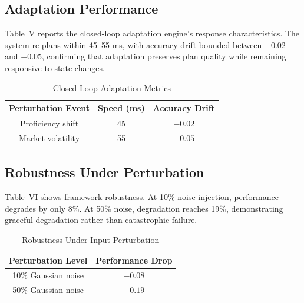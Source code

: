\documentclass[conference]{IEEEtran}
\begin{document}
\subsection{Adaptation Performance}

Table~V reports the closed-loop adaptation engine's response characteristics. The system re-plans within 45--55 ms, with accuracy drift bounded between $-0.02$ and $-0.05$, confirming that adaptation preserves plan quality while remaining responsive to state changes.

\begin{table}[htbp]
    \caption{Closed-Loop Adaptation Metrics}
    \begin{center}
        \begin{tabular}{|c|c|c|}
            \hline
            \textbf{Perturbation Event} & \textbf{Speed (ms)} & \textbf{Accuracy Drift} \\
            \hline
            Proficiency shift   & 45 & $-0.02$ \\
            \hline
            Market volatility   & 55 & $-0.05$ \\
            \hline
        \end{tabular}
        \label{tab:adapt}
    \end{center}
\end{table}

\subsection{Robustness Under Perturbation}

Table~VI shows framework robustness. At 10\% noise injection, performance degrades by only 8\%. At 50\% noise, degradation reaches 19\%, demonstrating graceful degradation rather than catastrophic failure.

\begin{table}[htbp]
    \caption{Robustness Under Input Perturbation}
    \begin{center}
        \begin{tabular}{|c|c|}
            \hline
            \textbf{Perturbation Level} & \textbf{Performance Drop} \\
            \hline
            10\% Gaussian noise & $-0.08$ \\
            \hline
            50\% Gaussian noise & $-0.19$ \\
            \hline
        \end{tabular}
        \label{tab:robust}
    \end{center}
\end{table}
\end{document}
